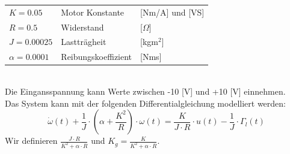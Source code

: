 \begin{aufgabe}
\begin{tabular}{@{}lll}
        $K = 0.05$          & Motor Konstante                   & [Nm/A] und [VS] \\
        $R = 0.5$           & Widerstand                        & [$\Omega$] \\
        $J = 0.00025$       & Lastträgheit                      & [kgm$^2$] \\
        $\alpha = 0.0001$   & Reibungskoeffizient               & [Nms] \\
    \end{tabular}
    \\
    Die Eingansspannung kann Werte zwischen -10 [V] und +10 [V] einnehmen. \\
    Das System kann mit der folgenden Differentialgleichung modelliert werden:
    \[ \dot{\omega}(t) 
        + \frac{1}{J} \cdot \left(\alpha + \frac{K^2}{R}\right) \cdot \omega(t) 
        = \frac{K}{J \cdot R} \cdot u(t) - \frac{1}{J} \cdot \Gamma_l(t)
    \]
    Wir definieren $\frac{J \cdot R}{K^2 + \alpha \cdot R}$ und 
    $K_g = \frac{K}{K^2 + \alpha \cdot R}$. 
\end{aufgabe}
